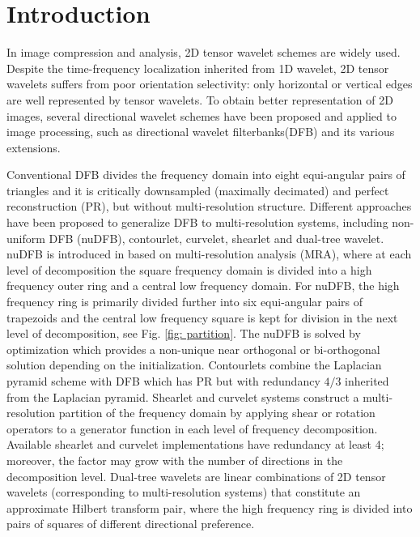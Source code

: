 \section{Introduction}

\iffalse
\begin{itemize}
\item review construction of directional wavelet, shearlet
\item what's new in our construction?
\item summary: framework, technique, reference(Durand, Cohen)
\item organization of the paper
\end{itemize}
\fi

In image compression and analysis, 2D tensor wavelet schemes are widely used. Despite the time-frequency localization inherited from 1D wavelet, 2D tensor wavelets suffers from poor orientation selectivity: only horizontal or vertical edges are well represented by tensor wavelets. To obtain better representation of 2D images, several directional wavelet schemes have been proposed and applied to image processing, such as directional wavelet filterbanks(DFB) and its various extensions.

Conventional DFB \cite{DFB92} divides the frequency domain into eight equi-angular pairs of triangles and it is critically downsampled (maximally decimated) and perfect reconstruction (PR), but without multi-resolution structure. 
Different approaches have been proposed to generalize DFB to multi-resolution systems, including non-uniform DFB (nuDFB), contourlet, curvelet, shearlet and dual-tree wavelet.
nuDFB is introduced in \cite{nuDFB05} based on multi-resolution analysis (MRA), where at each level of decomposition the square frequency domain is divided into a high frequency outer ring and a central low frequency domain. For nuDFB, the high frequency ring is primarily divided further into six equi-angular pairs of trapezoids and the central low frequency square is kept for division in the next level of decomposition, see Fig. \ref{fig: partition}. The nuDFB is solved by optimization which provides a non-unique near orthogonal or bi-orthogonal solution depending on the initialization.
Contourlets \cite{do2005contourlet} combine the Laplacian pyramid scheme with DFB which has PR but with redundancy $4/3$ inherited from the Laplacian pyramid.
Shearlet \cite{shearlet12book,easley2008sparse} and curvelet \cite{candes2006fast} systems construct a multi-resolution partition of the frequency domain by applying shear or rotation operators to a generator function in each level of frequency decomposition. Available shearlet and curvelet implementations have redundancy at least 4; moreover, the factor may grow with the number of directions in the decomposition level.
Dual-tree wavelets \cite{selesnick2005dual} are linear combinations of 2D tensor wavelets (corresponding to multi-resolution systems) that constitute an approximate Hilbert transform pair, where the high frequency ring is divided into pairs of squares of different directional preference.

